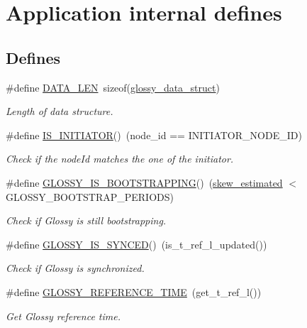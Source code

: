\hypertarget{group__glossy-test-defines}{
\section{Application internal defines}
\label{group__glossy-test-defines}
}
\subsection*{Defines}
\begin{DoxyCompactItemize}
\item 
\hypertarget{group__glossy-test-defines_gaf02e45f15080b8ec9dd7b286157617ff}{
\#define \hyperlink{group__glossy-test-defines_gaf02e45f15080b8ec9dd7b286157617ff}{DATA\_\-LEN}~sizeof(\hyperlink{structglossy__data__struct}{glossy\_\-data\_\-struct})}
\label{group__glossy-test-defines_gaf02e45f15080b8ec9dd7b286157617ff}

\begin{DoxyCompactList}\small\item\em Length of data structure. \end{DoxyCompactList}\item 
\hypertarget{group__glossy-test-defines_ga3d1e7d432a1b08c6c103a999b1dc76df}{
\#define \hyperlink{group__glossy-test-defines_ga3d1e7d432a1b08c6c103a999b1dc76df}{IS\_\-INITIATOR}()~(node\_\-id == INITIATOR\_\-NODE\_\-ID)}
\label{group__glossy-test-defines_ga3d1e7d432a1b08c6c103a999b1dc76df}

\begin{DoxyCompactList}\small\item\em Check if the nodeId matches the one of the initiator. \end{DoxyCompactList}\item 
\#define \hyperlink{group__glossy-test-defines_ga56eff93cc86164ca823e6853c8dbf8a1}{GLOSSY\_\-IS\_\-BOOTSTRAPPING}()~(\hyperlink{group__glossy-test-variables-sched-sync_ga8f7aae7ff4364a1481312cef44f65f73}{skew\_\-estimated} $<$ GLOSSY\_\-BOOTSTRAP\_\-PERIODS)
\begin{DoxyCompactList}\small\item\em Check if Glossy is still bootstrapping. \end{DoxyCompactList}\item 
\#define \hyperlink{group__glossy-test-defines_ga7d8d6a2abc29e1ea1ade49600faa5cfc}{GLOSSY\_\-IS\_\-SYNCED}()~(is\_\-t\_\-ref\_\-l\_\-updated())
\begin{DoxyCompactList}\small\item\em Check if Glossy is synchronized. \end{DoxyCompactList}\item 
\#define \hyperlink{group__glossy-test-defines_ga3eab42e5e2d60ea806b4c22447a9fb85}{GLOSSY\_\-REFERENCE\_\-TIME}~(get\_\-t\_\-ref\_\-l())
\begin{DoxyCompactList}\small\item\em Get Glossy reference time. \end{DoxyCompactList}\end{DoxyCompactItemize}


